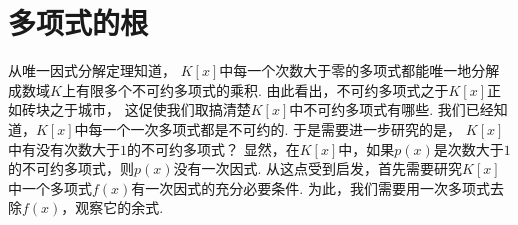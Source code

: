 \section{多项式的根}
从唯一因式分解定理知道，
\(K[x]\)中每一个次数大于零的多项式都能唯一地分解成数域\(K\)上有限多个不可约多项式的乘积.
由此看出，不可约多项式之于\(K[x]\)正如砖块之于城市，
这促使我们取搞清楚\(K[x]\)中不可约多项式有哪些.
我们已经知道，\(K[x]\)中每一个一次多项式都是不可约的.
于是需要进一步研究的是，
\(K[x]\)中有没有次数大于\(1\)的不可约多项式？
显然，在\(K[x]\)中，如果\(p(x)\)是次数大于\(1\)的不可约多项式，则\(p(x)\)没有一次因式.
从这点受到启发，首先需要研究\(K[x]\)中一个多项式\(f(x)\)有一次因式的充分必要条件.
为此，我们需要用一次多项式去除\(f(x)\)，观察它的余式.
